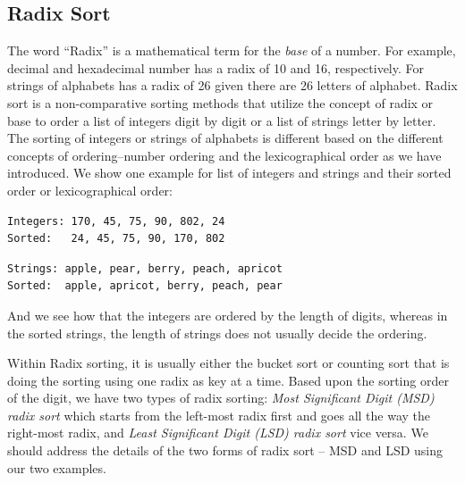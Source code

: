 \documentclass[../main.tex]{subfiles}
\begin{document}
\subsection{Radix Sort}
The word ``Radix'' is a mathematical term for the \textit{base} of a number. For example, decimal and hexadecimal number has a radix of 10 and 16, respectively. For strings of alphabets has a radix of 26 given there are 26 letters of alphabet. Radix sort is a non-comparative sorting methods that utilize the concept of radix or base to  order a list of integers digit by digit or a list of strings letter by letter.  The sorting of integers or strings of alphabets is different based on the different concepts of ordering--number ordering and the lexicographical order as we have introduced. We show one example for list of integers and strings and their sorted order or lexicographical order: 
\begin{lstlisting}[numbers=none]
Integers: 170, 45, 75, 90, 802, 24
Sorted:   24, 45, 75, 90, 170, 802
\end{lstlisting}

\begin{lstlisting}[numbers=none]
Strings: apple, pear, berry, peach, apricot
Sorted:  apple, apricot, berry, peach, pear
\end{lstlisting}
And we see how that the integers are ordered by the length of digits, whereas in the sorted strings, the length of strings does not usually decide the ordering. 

Within Radix sorting, it is  usually either the bucket sort or counting sort that is doing the sorting using one radix as key at a time. Based upon the sorting order of the digit, we have two types of radix sorting: \textit{Most Significant Digit (MSD) radix sort} which starts from the left-most radix first and goes all the way the right-most radix, and \textit{Least Significant Digit (LSD) radix sort} vice versa.  
We should address the details of the two forms of radix sort -- MSD and LSD using our two examples. 
\end{document}
